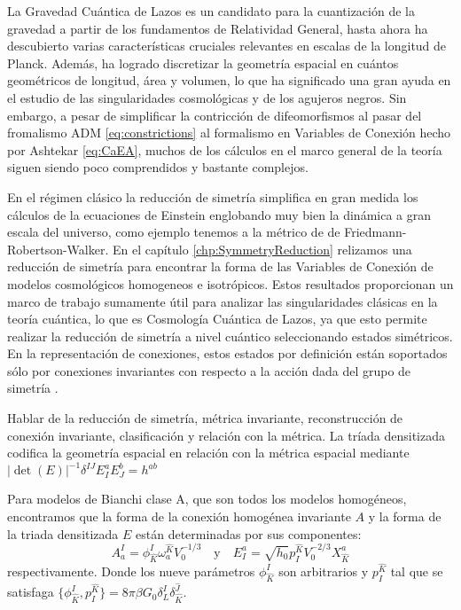 La Gravedad Cu\'{a}ntica de Lazos es un candidato para la cuantizaci\'{o}n de la gravedad a partir de los fundamentos de Relatividad General, hasta ahora ha descubierto varias caracter\'{i}sticas cruciales relevantes en escalas de la longitud de Planck. Adem\'{a}s, ha logrado discretizar la geometr\'{i}a espacial en cu\'{a}ntos geom\'{e}tricos de longitud, \'{a}rea y volumen, lo que ha significado una gran ayuda en el estudio de las singularidades cosmol\'{o}gicas y de los agujeros negros. Sin embargo, a pesar de simplificar la contricci\'{o}n de difeomorfismos al pasar del fromalismo ADM \eqref{eq:constrictions} al formalismo en Variables de Conexi\'{o}n hecho por Ashtekar \eqref{eq:CaEA}, muchos de los c\'{a}lculos en el marco general de la teor\'{i}a siguen siendo poco comprendidos y bastante complejos.

En el r\'{e}gimen cl\'{a}sico la reducci\'{o}n de simetr\'{i}a simplifica en gran medida los c\'{a}lculos de la ecuaciones de Einstein englobando muy bien la din\'{a}mica a gran escala del universo, como ejemplo tenemos a la m\'{e}trico de de Friedmann-Robertson-Walker. En el cap\'{i}tulo \ref{chp:SymmetryReduction} relizamos una reducci\'{o}n de simetr\'{i}a para encontrar la forma de las Variables de Conexi\'{o}n de modelos cosmol\'{o}gicos homogeneos e isotr\'{o}picos. Estos resultados proporcionan un marco de trabajo sumamente \'{u}til para analizar las singularidades cl\'{a}sicas en la teor\'{i}a cu\'{a}ntica, lo que es Cosmolog\'{i}a Cu\'{a}ntica de Lazos, ya que esto permite realizar la reducci\'{o}n de simetr\'{i}a a nivel cu\'{a}ntico seleccionando estados sim\'{e}tricos. {\color{red} En la representaci\'{o}n de conexiones, estos estados por definici\'{o}n est\'{a}n soportados s\'{o}lo por conexiones invariantes con respecto a la acci\'{o}n dada del grupo de simetr\'{i}a \cite{Kastrup, Bojowald2002}.}

{\color{OliveGreen} Hablar de la reducci\'{o}n de simetr\'{i}a, m\'{e}trica invariante, reconstrucci\'{o}n de conexi\'{o}n invariante, clasificaci\'{o}n y relaci\'{o}n con la m\'{e}trica. La tr\'{i}ada densitizada codifica la geometr\'{i}a espacial en relaci\'{o}n con la m\'{e}trica espacial mediante $|\det (E)|^{-1} \delta^{IJ} E^{a}_{I} E^{b}_{J} = h^{ab} $}

Para modelos de Bianchi clase A, que son todos los modelos homog\'{e}neos, encontramos que la forma de la conexi\'{o}n homog\'{e}nea invariante $A$ y la forma de la triada densitizada $E$ est\'{a}n determinadas por sus componentes:
%
\begin{equation*}
A^{I}_{a} = \phi^{I}_{\hat{K}} \omega^{\hat{K}}_{a} V^{-1/3}_{0} \quad \mathrm{y} \quad E^{a}_{I} = \sqrt{h_{0}} p^{\hat{K}}_{I} V^{-2/3}_{0} X^{a}_{\hat{K}}
\end{equation*}
%
respectivamente. Donde los nueve par\'{a}metros $\phi^{I}_{\hat{K}}$ son arbitrarios y $p^{\hat{K}}_{I}$ tal que se satisfaga $\{\phi^{I}_{\hat{K}}, p^{\hat{K}}_{I}\} = 8 \pi \beta G_{0} \delta^{I}_{L} \delta^{\hat{J}}_{\hat{K}}$.

